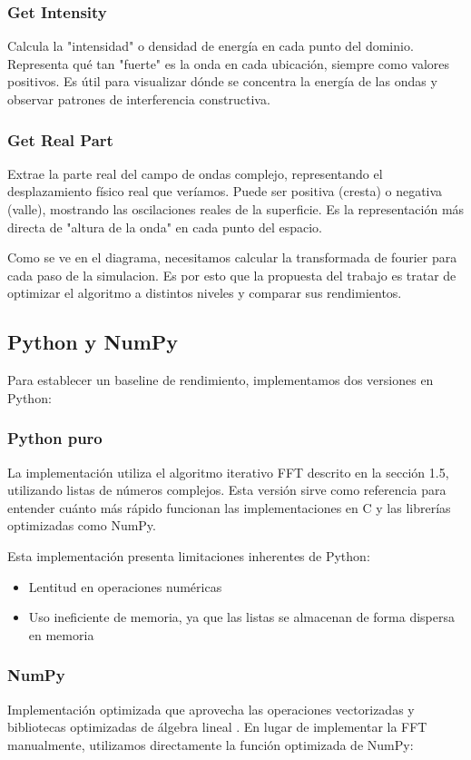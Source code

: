 \documentclass[a4paper]{article}
\begin{document}
\subsubsection{Get Intensity} Calcula la "intensidad" o densidad de energía en cada punto del dominio. Representa qué tan "fuerte" es la onda en cada ubicación, siempre como valores positivos. Es útil para visualizar dónde se concentra la energía de las ondas y observar patrones de interferencia constructiva.

\subsubsection{Get Real Part} Extrae la parte real del campo de ondas complejo, representando el desplazamiento físico real que veríamos. Puede ser positiva (cresta) o negativa (valle), mostrando las oscilaciones reales de la superficie. Es la representación más directa de "altura de la onda" en cada punto del espacio.

Como se ve en el diagrama, necesitamos calcular la transformada de fourier para cada paso de la simulacion. Es por esto que la
propuesta del trabajo es tratar de optimizar el algoritmo a distintos niveles y comparar sus rendimientos.

\subsection{Python y NumPy}

Para establecer un baseline de rendimiento, implementamos dos versiones en Python:

\subsubsection{Python puro} La implementación utiliza el algoritmo iterativo FFT descrito en la sección 1.5, utilizando listas de números complejos.
Esta versión sirve como referencia para entender cuánto más rápido funcionan las implementaciones en C y las librerías optimizadas como NumPy.

Esta implementación presenta limitaciones inherentes de Python:
\begin{itemize}
    \item Lentitud en operaciones numéricas
    \item Uso ineficiente de memoria, ya que las listas se almacenan de forma dispersa en memoria
\end{itemize}

\subsubsection{NumPy} Implementación optimizada que aprovecha las operaciones vectorizadas y bibliotecas optimizadas de álgebra lineal \cite{numpy2020array}. En lugar
de implementar la FFT manualmente, utilizamos directamente la función optimizada de NumPy:
\end{document}
